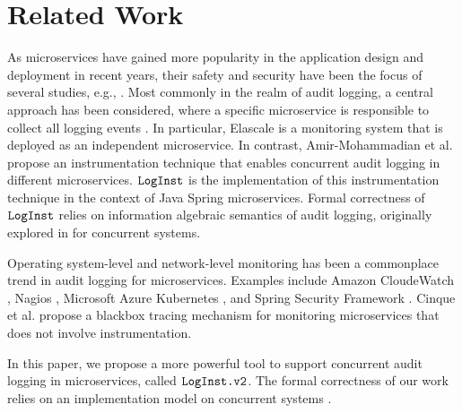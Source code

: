 \section{Related Work} \label{sec:relwork}

As microservices have gained more popularity in the application design and deployment in recent years, their safety and security have been the focus of several studies, e.g., \cite{mateus2021security, nkomo2019software, nehme2019securing, yu2019survey}. Most commonly in the realm of audit logging, a central approach has been considered, where a specific microservice is responsible to collect all logging events \cite{barabanov2021security, kazanavivcius2019migrating}. In particular, Elascale \cite{khazaei2017elascale} is a monitoring system that is deployed as an independent microservice. In contrast, Amir-Mohammadian et al. \cite{stpsa21} propose an instrumentation technique that enables concurrent audit logging in different microservices. $\texttt{LogInst}$ \cite{github1} is the implementation of this instrumentation technique in the context of Java Spring microservices. Formal correctness of $\texttt{LogInst}$ relies on information algebraic \cite{Kohlas14} semantics of audit logging, originally explored in \cite{lsfa20}  for concurrent systems. 

Operating system-level and network-level monitoring  has been a commonplace trend in audit logging for microservices. Examples include Amazon CloudeWatch \cite{cloudwatch}, Nagios \cite{nagios}, Microsoft Azure Kubernetes \cite{kuber}, and Spring Security Framework \cite{nguyen2019applying}. Cinque et al. \cite{cinque2019microservices} propose a blackbox tracing mechanism for monitoring microservices that does not involve instrumentation. 

In this paper, we propose a more powerful tool to support concurrent audit logging in microservices, called $\texttt{LogInst.v2}$. The formal correctness of our work relies on an implementation model on concurrent systems \cite{amirmoh-tr21}.


